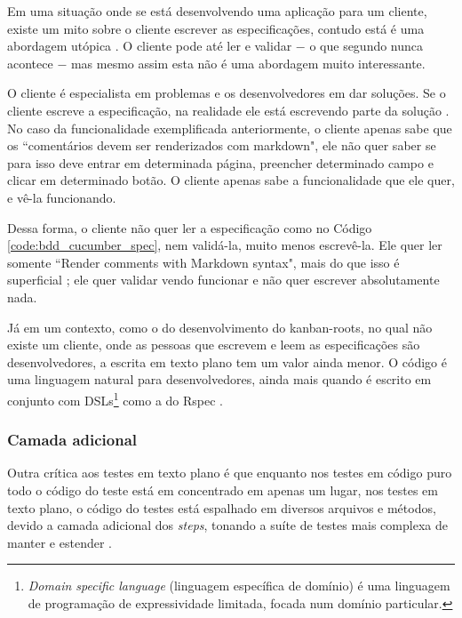 Em uma situação onde se está desenvolvendo uma aplicação para um cliente, existe um mito sobre o cliente escrever as especificações, contudo está é uma abordagem utópica \cite{SteakOverCucumber, CucumberForVegetarians, ClientsWritingCucumber}. O cliente pode até ler e validar $-$ o que segundo  nunca acontece $-$ mas mesmo assim esta não é uma abordagem muito interessante.

O cliente é especialista em problemas e os desenvolvedores em dar soluções. Se o cliente escreve a especificação, na realidade ele está escrevendo parte da solução \cite{SteakOverCucumber}. No caso da funcionalidade exemplificada anteriormente, o cliente apenas sabe que os ``comentários devem ser renderizados com markdown", ele não quer saber se para isso deve entrar em determinada página, preencher determinado campo e clicar em determinado botão. O cliente apenas sabe a funcionalidade que ele quer, e vê-la funcionando.

Dessa forma, o cliente não quer ler a especificação como no Código \ref{code:bdd_cucumber_spec}, nem validá-la, muito menos escrevê-la. Ele quer ler somente ``Render comments with Markdown syntax", mais do que isso é superficial \cite{WhyBotherWithCucumberTesting}; ele quer validar vendo funcionar e não quer escrever absolutamente nada.

Já em um contexto, como o do desenvolvimento do kanban-roots, no qual não existe um cliente, onde as pessoas que escrevem e leem as especificações são desenvolvedores, a escrita em texto plano tem um valor ainda menor. O código é uma linguagem natural para desenvolvedores, ainda mais quando é escrito em conjunto com DSLs\footnote{\textit{Domain specific language} (linguagem específica de domínio) é uma linguagem de programação de expressividade limitada, focada num domínio particular.} como a do Rspec \cite{SteakOverCucumber}.


\subsubsection{Camada adicional} %
\label{subsub:camada_adicional}

Outra crítica aos testes em texto plano é que enquanto nos testes em código puro todo o código do teste está em concentrado em apenas um lugar, nos testes em texto plano, o código do testes está espalhado em diversos arquivos e métodos, devido a camada adicional dos \textit{steps}, tonando a suíte de testes mais complexa de manter e estender \cite{SteakOverCucumber}.

